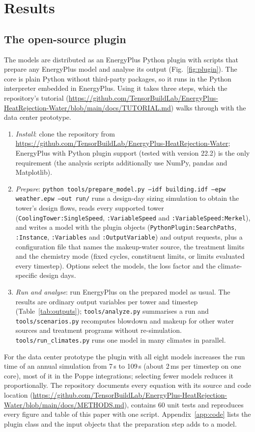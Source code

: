 \documentclass[preprint,12pt]{elsarticle}
\begin{document}
\section{Results}\label{sec:results}
\subsection{The open-source plugin}\label{sec:tool}
The models are distributed as an EnergyPlus Python plugin with scripts that prepare any EnergyPlus model and analyse
its output (Fig.~\ref{fig:plugin}). The core is plain Python without third-party packages, so it runs in the Python
interpreter embedded in EnergyPlus. Using it takes three steps, which the repository's tutorial (\url{https://github.com/TensorBuildLab/EnergyPlus-HeatRejection-Water/blob/main/docs/TUTORIAL.md})
walks through with the data center prototype.
\begin{enumerate}
\item \emph{Install}: clone the repository from \url{https://github.com/TensorBuildLab/EnergyPlus-HeatRejection-Water}; EnergyPlus with Python plugin support (tested with version 22.2) is the only
requirement (the analysis scripts additionally use NumPy, pandas and Matplotlib).
\item \emph{Prepare}: \texttt{python tools/prepare\_model.py --idf building.idf --epw weather.epw --out run/} runs a
design-day sizing simulation to obtain the tower's design flows, reads every supported tower
(\texttt{CoolingTower:SingleSpeed}, \texttt{:VariableSpeed} and \texttt{:VariableSpeed:Merkel}), and writes a model with
the plugin objects (\texttt{PythonPlugin:SearchPaths}, \texttt{:Instance}, \texttt{:Variables} and
\texttt{:OutputVariable}) and output requests, plus a configuration file that names the makeup-water source, the treatment
limits and the chemistry mode (fixed cycles, constituent limits, or limits evaluated every timestep). Options select the
models, the loss factor and the climate-specific design days.
\item \emph{Run and analyse}: run EnergyPlus on the prepared model as usual. The results are ordinary output variables
per tower and timestep (Table~\ref{tab:outputs}); \texttt{tools/analyze.py} summarises a run and
\texttt{tools/scenarios.py} recomputes blowdown and makeup for other water sources and treatment programs without
re-simulation. \texttt{tools/run\_climates.py} runs one model in many climates in parallel.
\end{enumerate}
For the data center prototype the plugin with all eight models increases the run time of an annual simulation from 7\,s
to 109\,s (about 2\,ms per timestep on one core), most of it in the Poppe integrations; selecting fewer models reduces it
proportionally. The repository documents every equation with its source and code location (\url{https://github.com/TensorBuildLab/EnergyPlus-HeatRejection-Water/blob/main/docs/METHODS.md}),
contains 60 unit tests and reproduces every figure and table of this paper with one script. Appendix~\ref{app:code}
lists the plugin class and the input objects that the preparation step adds to a model.
\end{document}
